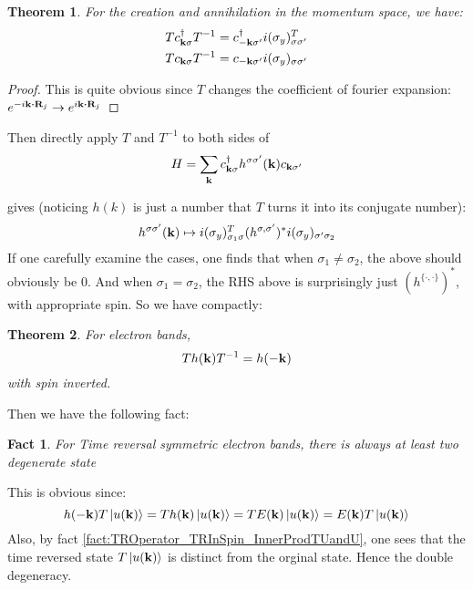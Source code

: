\documentclass{article}
\numberwithin{equation}{subsection} %
\newtheorem{thm}{Theorem}[section]
\newtheorem{fact}{Fact}[section]
\theoremstyle{definition}
\begin{document}
        \begin{thm}
            For the creation and annihilation in the momentum space,
            we have:
            \begin{align}
                & Tc^\dagger_{\vb{k}\sigma} T^{-1} =
                    c^\dagger_{\vb{-k}\sigma'}
                    i(\sigma_y)^T_{\sigma\sigma'} \\
                & Tc_{\vb{k}\sigma} T^{-1} =
                    c_{\vb{-k}\sigma'}
                    i(\sigma_y)_{\sigma\sigma'}
            \end{align}
        \end{thm}
        \begin{proof}
            This is quite obvious since $T$ changes the coefficient of
            fourier expansion: $e^{-i \vb{k}\vdot\vb{R}_j} \to 
            e^{i \vb{k}\vdot\vb{R}_j}$
        \end{proof}
        Then directly apply $T$ and $T^{-1}$ to both sides of
        $$H = \sum_{\vb{k}} c^\dagger_{\vb{k}\sigma}
            h^{\sigma\sigma'}(\vb{k})
            c_{\vb{k}\sigma'}$$

            gives (noticing $h(k)$ is just a number that $T$ turns it
            into its conjugate number):
        \begin{equation}
            h^{\sigma\sigma'}(\vb{k}) \mapsto
            i(\sigma_y)^T_{\sigma_1\sigma} (h^{\sigma,\sigma'})^*
            i(\sigma_y)_{\sigma'\sigma_2}
        \end{equation}
        If one carefully examine the cases, one finds that when
        $\sigma_1\neq\sigma_2$, the above should obviously be $0$. And
        when $\sigma_1=\sigma_2$, the RHS above is surprisingly just
        $(h^{\{\cdot,\cdot\}})^*$, with appropriate spin.
        So we have compactly:
        \begin{thm}
            For electron bands,
            \begin{equation}
                Th(\vb{k})T^{-1} = h(-\vb{k})
            \end{equation}
            with spin inverted.
        \end{thm}
        
        Then we have the following fact:
        \begin{fact}
            For Time reversal symmetric electron bands, there is
            always at least two degenerate state
        \end{fact}
        This is obvious since:
        $$h(-\vb{k}) T\ket{u(\vb{k})} = Th(\vb{k})\ket{u(\vb{k})}
        = TE(\vb{k})\ket{u(\vb{k})} = E(\vb{k})T\ket{u(\vb{k})} $$
        Also, by fact \ref{fact:TROperator_TRInSpin_InnerProdTUandU},
        one sees that the time reversed state $T\ket{u(\vb{k})}$ is
        distinct from the orginal state. Hence the double degeneracy.
\end{document}

